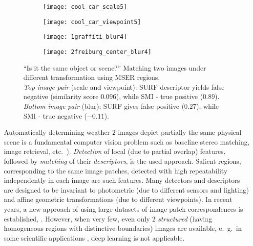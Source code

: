 \documentclass[a4paper,11pt]{article}
\begin{document}
\begin{wrapfigure}{r}{0.5\textwidth}
 \vspace{-22pt} 
\begin{center}
\begin{subfigure}[b]{0.22\textwidth}
  \texttt{[image: cool\_car\_scale5]}
\end{subfigure}
\begin{subfigure}[b]{0.22\textwidth}
\texttt{[image: cool\_car\_viewpoint5]}
\end{subfigure}
\end{center}
\vspace{-22pt}
\begin{center}
\begin{subfigure}[b]{0.22\textwidth}
  \texttt{[image: 1graffiti\_blur4]}
\end{subfigure}
\begin{subfigure}[b]{0.22\textwidth}
\texttt{[image: 2freiburg\_center\_blur4]}
\end{subfigure}
\end{center}
\vspace{-20pt}
\caption{\small ``Is it the same object or scene?'' Matching two images under different transformation using MSER regions.\\ {\em Top image pair} (scale and viewpoint): SURF descriptor yields false negative (similarity score $0.096$), while SMI - true positive ($0.89$).
{\em Bottom image pair} (blur): SURF gives false positive ($0.27$), while SMI - true negative ($-0.11$).}
  \vspace{-16pt}
\end{wrapfigure}\label{fig:intro1}

Automatically determining weather $2$ images depict partially the same physical scene is a fundamental computer vision problem such as baseline stereo matching, image retrieval, etc.~\cite{EscaleraCVPR07,Matas2002BMVC}). {\em Detection} of local (due to partial overlap) features, followed by {\em matching} of their {\em descriptors}, is the used approach. Salient regions, corresponding to the same image patches, detected with high repeatability independently in each image are such features. Many detectors and descriptors are designed to be invariant to photometric (due to different sensors and lighting) and affine geometric transformations (due to different viewpoints). In recent years, a new approach of using large datasets of image patch correspondences is established, \cite{Snavely2008, ZagoruykoK15}. However, when very few, even only $2$ {\em structured} (having homogeneous regions with distinctive boundaries) images are available, e.~g.~in some scientific applications \cite{Ranguelova2016AICCSA}, deep learning is not applicable.
\end{document}
